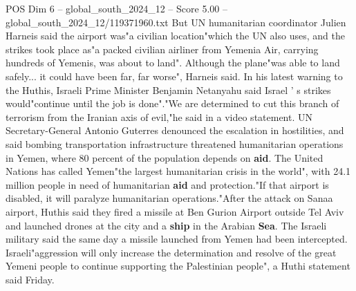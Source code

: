 \begin{textsample}{POS Dim 6 – global\_south\_2024\_12 – Score 5.00 – global\_south\_2024\_12/119371960.txt}
But UN humanitarian coordinator Julien Harneis said the airport was"a civilian location"which the UN also uses, and the strikes took place as"a packed civilian airliner from Yemenia Air, carrying hundreds of Yemenis, was about to land".
Although the plane"was able to land safely... it could have been far, far worse", Harneis said.
In his latest warning to the Huthis, Israeli Prime Minister Benjamin Netanyahu said Israel ' s strikes would"continue until the job is done"."We are determined to cut this branch of terrorism from the Iranian axis of evil,"he said in a video statement.
UN Secretary-General Antonio Guterres denounced the escalation in hostilities, and said bombing transportation infrastructure threatened humanitarian operations in Yemen, where 80 percent of the population depends on \textbf{aid}.
The United Nations has called Yemen"the largest humanitarian crisis in the world", with 24.1 million people in need of humanitarian \textbf{aid} and protection."If that airport is disabled, it will paralyze humanitarian operations."After the attack on Sanaa airport, Huthis said they fired a missile at Ben Gurion Airport outside Tel Aviv and launched drones at the city and a \textbf{ship} in the Arabian \textbf{Sea}.
The Israeli military said the same day a missile launched from Yemen had been intercepted.
Israeli"aggression will only increase the determination and resolve of the great Yemeni people to continue supporting the Palestinian people", a Huthi statement said Friday.

\end{textsample}
